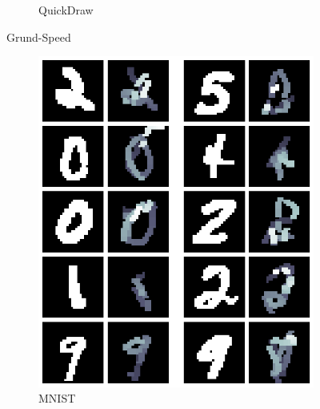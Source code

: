 \begin{figure}[!ht]
\begin{subfigure}[b]{0.3\textwidth}
        \caption{QuickDraw}
    \end{subfigure}
    \caption{Grund-Speed}
    \label{fig:Grund-Speed}
\end{figure}

\begin{figure}[!ht]
    \centering
    \begin{subfigure}[b]{0.3\textwidth}
        \centering
        \includegraphics[width=\textwidth]{images/resultate/physics-base-mnist.png}
        \caption{MNIST}
    \end{subfigure}
    \begin{subfigure}[b]{0.3\textwidth}
        \centering

\end{subfigure}
\end{figure}
